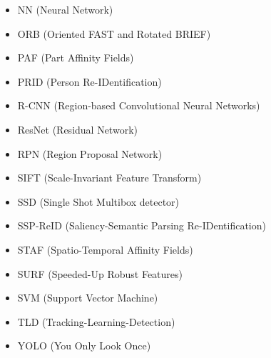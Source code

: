 \begin{itemize}
	\item NN (Neural Network)
	\item ORB (Oriented FAST and Rotated BRIEF)
	\item PAF (Part Affinity Fields)
	\item PRID (Person Re-IDentification)
	\item R-CNN (Region-based Convolutional Neural Networks)
	\item ResNet (Residual Network)
	\item RPN (Region Proposal Network)
	\item SIFT (Scale-Invariant Feature Transform)
	\item SSD (Single Shot Multibox detector)
	\item SSP-ReID (Saliency-Semantic Parsing Re-IDentification)
	\item STAF (Spatio-Temporal Affinity Fields)
	\item SURF (Speeded-Up Robust Features)
	\item SVM (Support Vector Machine)
	\item TLD (Tracking-Learning-Detection)
	\item YOLO (You Only Look Once)
\end{itemize}



